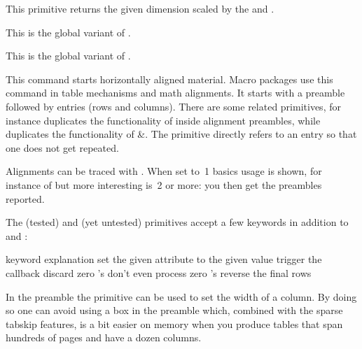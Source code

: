 \stopnewprimitive

\startnewprimitive[title={\prm {glyphyscaled}}]

This primitive returns the given dimension scaled by the  and
.

\stopnewprimitive

\startnewprimitive[title={\prm {gtoksapp}}]

This is the global variant of .

\stopnewprimitive

\startnewprimitive[title={\prm {gtokspre}}]

This is the global variant of .

\stopnewprimitive

\startoldprimitive[title={\prm {halign}}]

This command starts horizontally aligned material. Macro packages use this
command in table mechanisms and math alignments. It starts with a preamble
followed by entries (rows and columns). There are some related primitives, for
instance  duplicates the functionality of \type {#} inside
alignment preambles, while  duplicates the functionality of \type
{&}. The  primitive directly refers to an entry so that one
does not get repeated.

Alignments can be traced with . When set to~1 basics
usage is shown, for instance of  but more interesting is~2 or more:
you then get the preambles reported.

The  (tested) and  (yet untested) primitives accept a
few keywords in addition to  and :

\starttabulate[|l|p|]
\FL
\BC keyword          \BC explanation \NC \NR
\TL
\NC {}     \NC set the given attribute to the given value \NC \NR
\NC {} \NC trigger the  callback \NC \NR
\NC {}  \NC discard zero 's \NC \NR
\NC {}  \NC don't even process zero 's \NC \NR
\NC {}  \NC reverse the final rows \NC \NR
\LL
\stoptabulate

In the preamble the  primitive can be used to set the width of a
column. By doing so one can avoid using a box in the preamble which, combined
with the sparse tabskip features, is a bit easier on memory when you produce
tables that span hundreds of pages and have a dozen columns.

